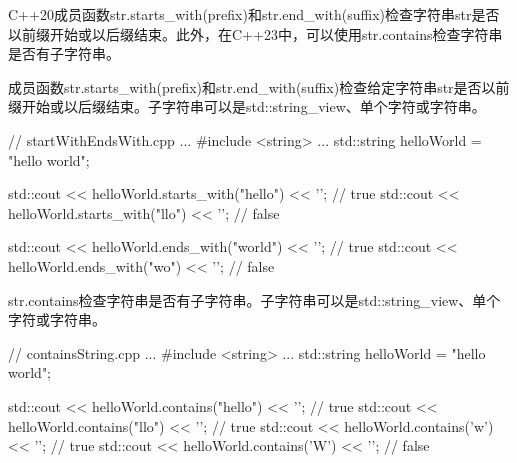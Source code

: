 C++20成员函数str.starts\_with(prefix)和str.end\_with(suffix)检查字符串str是否以前缀开始或以后缀结束。此外，在C++23中，可以使用str.contains检查字符串是否有子字符串。


成员函数str.starts\_with(prefix)和str.end\_with(suffix)检查给定字符串str是否以前缀开始或以后缀结束。子字符串可以是std::string\_view、单个字符或字符串。


\begin{cpp}
// startWithEndsWith.cpp
...
#include <string>
...
std::string helloWorld = "hello world";

std::cout << helloWorld.starts_with("hello") << '\n'; // true
std::cout << helloWorld.starts_with("llo") << '\n'; // false

std::cout << helloWorld.ends_with("world") << '\n'; // true
std::cout << helloWorld.ends_with("wo") << '\n'; // false
\end{cpp}


str.contains检查字符串是否有子字符串。子字符串可以是std::string\_view、单个字符或字符串。


\begin{cpp}
// containsString.cpp
...
#include <string>
...
std::string helloWorld = "hello world";

std::cout << helloWorld.contains("hello") << '\n'; // true
std::cout << helloWorld.contains("llo") << '\n'; // true
std::cout << helloWorld.contains('w') << '\n'; // true
std::cout << helloWorld.contains('W') << '\n'; // false
\end{cpp}

































